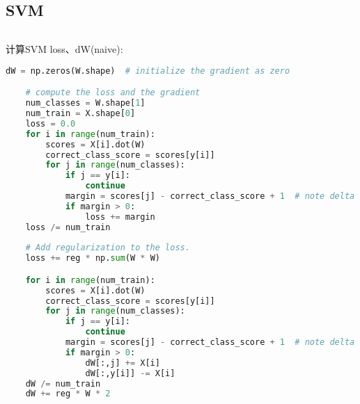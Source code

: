 \documentclass[a4paper]{article}
\begin{document}
\subsection{SVM}
\begin{lstlisting}[language=Python, caption=Python example]

\end{lstlisting}
计算SVM loss、dW(naive):
\begin{lstlisting}[language=Python, caption=SVM(naive)]
    dW = np.zeros(W.shape)  # initialize the gradient as zero

    # compute the loss and the gradient
    num_classes = W.shape[1]
    num_train = X.shape[0]
    loss = 0.0
    for i in range(num_train):
        scores = X[i].dot(W)
        correct_class_score = scores[y[i]]
        for j in range(num_classes):
            if j == y[i]:
                continue
            margin = scores[j] - correct_class_score + 1  # note delta = 1
            if margin > 0:
                loss += margin
    loss /= num_train
    
    # Add regularization to the loss.
    loss += reg * np.sum(W * W)

    for i in range(num_train):
        scores = X[i].dot(W)
        correct_class_score = scores[y[i]]
        for j in range(num_classes):
            if j == y[i]:
                continue
            margin = scores[j] - correct_class_score + 1  # note delta = 1
            if margin > 0:
                dW[:,j] += X[i]
                dW[:,y[i]] -= X[i]
    dW /= num_train 
    dW += reg * W * 2 
\end{lstlisting}
\end{document}

